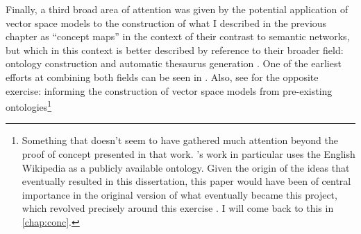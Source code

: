 Finally, a third broad area of attention was given by the potential application of vector space models to the construction of what I described in the previous chapter as ``concept maps'' in the context of their contrast to semantic networks, but which in this context is better described by reference to their broader field: ontology construction and automatic thesaurus generation \citep{grefenstette1994a}.
One of the earliest efforts at combining both fields can be seen in \citet{rohde2006}.
Also, see \citet{gabrilovich2007} for the opposite exercise: informing the construction of vector space models from pre-existing ontologies\footnote{
    Something that doesn't seem to have gathered much attention beyond the proof of concept presented in that work.
    \citeauthor{gabrilovich2007}'s work in particular uses the English Wikipedia as a publicly available ontology.
    Given the origin of the ideas that eventually resulted in this dissertation, this paper would have been of central importance in the original version of what eventually became this project, which revolved precisely around this exercise \citep{atria2009}.
    I will come back to this in \autoref{chap:conc}.
}


